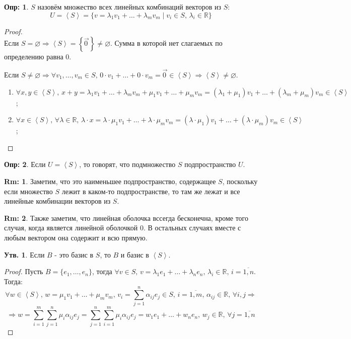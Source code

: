\documentclass[12pt]{article}
\newcommand{\MR}{\mathbb{R}}
\newcommand{\VN}{\varnothing}
\theoremstyle{definition}
\newtheorem{defn}{Опр:}
\newtheorem{rem}{Rm:}
\newtheorem{prop}{Утв.}
\newcommand{\ddsum}[2]{\displaystyle\sum\limits_{#1}^{#2}}
\newcommand{\linsp}[1]{\left\langle #1 \right\rangle }
\newcommand{\vecm}[1]{\overrightarrow{#1\,}}
\begin{document}
\begin{defn}
	 $S$ назовём множество всех линейных комбинаций векторов из $S$: 
	$$
		U = \linsp{S} = \{v = \lambda_1 v_1 + \dotsc + \lambda_m v_m \mid v_i \in S, \, \lambda_i \in \MR\}
	$$
\end{defn}
\begin{proof}\hfill\\
	Если $S = \VN \Rightarrow \linsp{S} = \left\{\vecm{0}\right\} \neq \VN$. Сумма в которой нет слагаемых по определению равна $0$.
	
	Если $S \neq \VN \Rightarrow \forall v_1, \dotsc, v_m \in S, \, 0{\cdot}v_1 + \dotsc + 0{\cdot}v_m = \vecm{0} \in \linsp{S} \Rightarrow \linsp{S} \neq \VN$. 
	
	\begin{enumerate}[label=\arabic*)]
		\item $\forall x,y \in \linsp{S}, \, x + y = \lambda_1 v_1 + \dotsc + \lambda_m v_m + \mu_1 v_1 + \dotsc + \mu_m v_m = (\lambda_1 + \mu_1)v_1 + \dotsc + (\lambda_m + \mu_m)v_m \in \linsp{S}$;
		\item $\forall x \in \linsp{S}, \, \forall \lambda \in \MR, \, \lambda{\cdot}x = \lambda{\cdot}\mu_1 v_1 + \dotsc + \lambda{\cdot}\mu_m v_m = (\lambda {\cdot} \mu_1) v_1 + \dotsc + (\lambda {\cdot} \mu_m)v_m \in \linsp{S}$;
	\end{enumerate}
\end{proof}
\begin{defn}
	Если $U = \linsp{S}$, то говорят, что подмножество $S$  подпространство $U$.
\end{defn}
\begin{rem}
	Заметим, что это наименьшее подпространство, содержащее $S$, поскольку если множество $S$ лежит в каком-то подпространстве, то там же лежат и все линейные комбинации векторов из $S$.
\end{rem}
\begin{rem}
	Также заметим, что линейная оболочка вссегда бесконечна, кроме того случая, когда является линейной оболочкой $0$. В остальных случаях вместе с любым вектором она содержит и всю прямую.
\end{rem}
\begin{prop}
	Если $B$ - это базис в $S$, то $B$ и базис в $\linsp{S}$.
\end{prop}
\begin{proof}
	Пусть $B = \{e_1, \dotsc, e_n\}$, тогда $\forall v \in S, \, v = \lambda_1 e_1 + \dotsc + \lambda_n e_n, \, \lambda_ i \in \MR, \, i =\overline{1,n}$. Тогда:
	$$
		\forall w \in \linsp{S}, \, w = \mu_1 v_1 + \dotsc + \mu_m v_m, \, v_i = \ddsum{j = 1}{n}\alpha_{ij}e_j \in S, \, i = \overline{1,m}, \, \alpha_{ij} \in \MR, \, \forall i,j \Rightarrow 
	$$
	$$
		\Rightarrow w = \ddsum{i = 1}{m}\ddsum{j = 1}{n}\mu_i\alpha_{ij}e_j = \ddsum{j = 1}{n} \ddsum{i = 1}{m} \mu_i\alpha_{ij}e_j =  w_1 e_1 + \dotsc + w_n e_n, \, w_j \in \MR, \, \forall j = \overline{1,n}
	$$ 
\end{proof}
\end{document}

